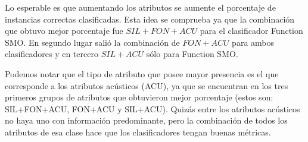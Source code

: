 
Lo esperable es que aumentando los atributos se aumente el porcentaje de instancias correctas clasificadas. Esta idea se comprueba ya que la combinación que obtuvo mejor porcentaje fue $SIL+FON+ACU$ para el clasificador Function SMO. En segundo lugar salió la combinación de $FON+ACU$ para ambos clasificadores y en tercero $SIL+ACU$ sólo para Function SMO. 

Podemos notar que el tipo de atributo que posee mayor presencia es el que corresponde a los atributos acústicos (ACU), ya que se encuentran en los tres primeros grupos de atributos que obtuvieron mejor porcentaje (estos son: SIL+FON+ACU, FON+ACU y SIL+ACU). Quizás entre los atributos acústicos no haya uno con información predominante, pero la combinación de todos los atributos de esa clase hace que los clasificadores tengan buenas métricas.